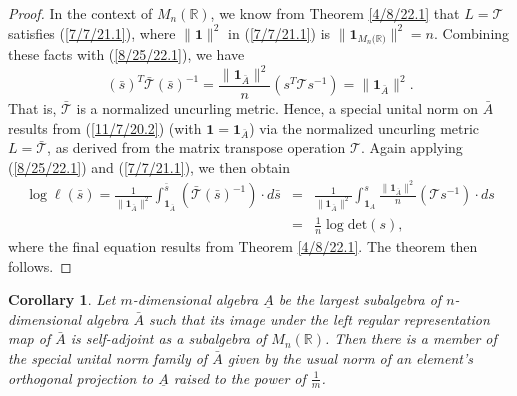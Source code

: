 \documentclass{amsart}
\numberwithin{equation}{section}
\newtheorem{corollary}[theorem]{Corollary}
\theoremstyle{definition}
\numberwithin{theorem}{section}
\begin{document}
\begin{proof}
In the context of $M_n(\mathbb{R})$, we know from Theorem \ref{4/8/22.1} that $L=\mathcal{T}$ satisfies (\ref{7/7/21.1}), where $\|\mathbf{1}\|^2$ in  (\ref{7/7/21.1}) is $\|\mathbf{1}_{M_n({\mathbb{R})}}\|^2 = n$.  Combining these facts with (\ref{8/25/22.1}), we have \begin{equation}\label{9/27/23.1} (\bar{s})^T \bar{\mathcal{T}} (\bar{s})^{-1} = \frac{\|\mathbf{1}_{\bar{A}}\|^2}{n}( s^T \mathcal{T} s^{-1}) = \|\mathbf{1}_{\bar{A}}\|^2 .\end{equation} 
That is, $\mathcal{\bar{T}}$ is a normalized uncurling metric.  Hence, a special unital norm on $\bar{A}$ results from (\ref{11/7/20.2}) (with $\mathbf{1}=\mathbf{1}_{\bar{A}}$)  via the normalized uncurling metric $L = \bar{\mathcal{T}}$, as derived from the matrix transpose operation $\mathcal{T}$.  
 Again applying (\ref{8/25/22.1}) and (\ref{7/7/21.1}),  we then obtain 
\begin{eqnarray}\nonumber \log\ell(\bar{s}) = \frac{1}{\|\mathbf{1}_{\bar{A}}\|^2} \int_{\mathbf{1}_{\bar{A}}}^{\bar{s}} (\bar{\mathcal{T}}(\bar{s})^{-1})\cdot d\bar{s}
 &=& \frac{1}{\|\mathbf{1}_{\bar{A}}\|^2} \int_{\mathbf{1}_{A}}^{s} \frac{\|\mathbf{1}_{\bar{A}}\|^2}{n}(\mathcal{T}s^{-1})\cdot ds \\ &=& \frac{1}{n} \log\text{det}(s),\label{9/27/23.2}\end{eqnarray} where the final equation results from Theorem \ref{4/8/22.1}.
The theorem then follows. 
 \end{proof} 
 
  \begin{corollary}\label{11/17/22.1}
  Let $m$-dimensional algebra $\underline{A}$ be the largest subalgebra of $n$-dimensional algebra $\bar{A}$ such that its image under the left regular representation map of $\bar{A}$ is self-adjoint as a subalgebra of $M_n(\mathbb{R})$. Then there is a member of the special unital norm family of  $\bar{A}$ given by the usual norm of an element's orthogonal projection to $\underline{A}$ raised to the power of $\frac{1}{m}$.
  \end{corollary}
 
\end{document}
